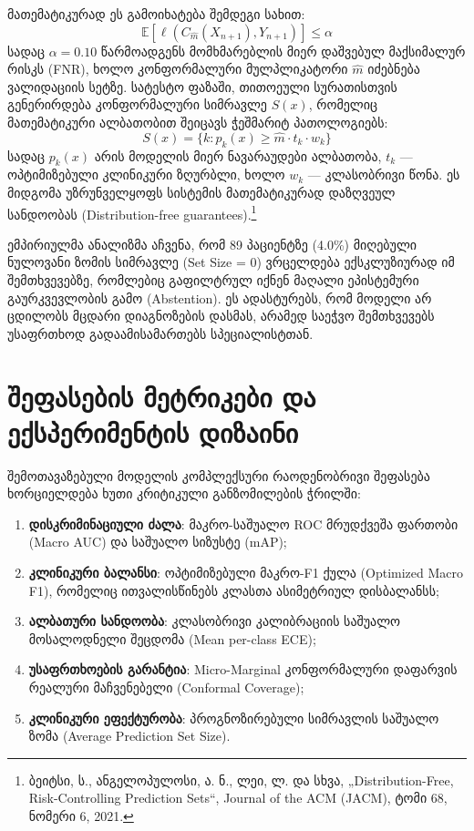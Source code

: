 \documentclass[12pt,a4paper,oneside]{report}
\begin{document}
მათემატიკურად ეს გამოიხატება შემდეგი სახით:
\begin{equation}
\mathbb{E}[\ell(C_{\hat{m}}(X_{n+1}), Y_{n+1})] \leq \alpha
\end{equation}
სადაც $\alpha = 0.10$ წარმოადგენს მომხმარებლის მიერ დაშვებულ მაქსიმალურ რისკს (FNR), ხოლო კონფორმალური მულპლიკატორი $\hat{m}$ იძებნება ვალიდაციის სეტზე. სატესტო ფაზაში, თითოეული სურათისთვის გენერირდება კონფორმალური სიმრავლე $S(x)$, რომელიც მათემატიკური ალბათობით შეიცავს ჭეშმარიტ პათოლოგიებს:
\begin{equation}
S(x) = \{ k : p_k(x) \geq \hat{m} \cdot t_k \cdot w_k \}
\end{equation}
სადაც $p_k(x)$ არის მოდელის მიერ ნავარაუდები ალბათობა, $t_k$ — ოპტიმიზებული კლინიკური ზღურბლი, ხოლო $w_k$ — კლასობრივი წონა. ეს მიდგომა უზრუნველყოფს სისტემის მათემატიკურად დაზღვეულ სანდოობას (Distribution-free guarantees).\footnote{ბეიტსი, ს., ანგელოპულოსი, ა. ნ., ლეი, ლ. და სხვა, „Distribution-Free, Risk-Controlling Prediction Sets“, Journal of the ACM (JACM), ტომი 68, ნომერი 6, 2021.} 

ემპირიულმა ანალიზმა აჩვენა, რომ 89 პაციენტზე (4.0\%) მიღებული ნულოვანი ზომის სიმრავლე (Set Size = 0) ვრცელდება ექსკლუზიურად იმ შემთხვევებზე, რომლებიც გაფილტრულ იქნენ მაღალი ეპისტემური გაურკვევლობის გამო (Abstention). ეს ადასტურებს, რომ მოდელი არ ცდილობს მცდარი დიაგნოზების დასმას, არამედ საეჭვო შემთხვევებს უსაფრთხოდ გადაამისამართებს სპეციალისტთან.

\section{შეფასების მეტრიკები და ექსპერიმენტის დიზაინი}
შემოთავაზებული მოდელის კომპლექსური რაოდენობრივი შეფასება ხორციელდება ხუთი კრიტიკული განზომილების ჭრილში: 
\begin{enumerate}
    \item \textbf{დისკრიმინაციული ძალა}: მაკრო-საშუალო ROC მრუდქვეშა ფართობი (Macro AUC) და საშუალო სიზუსტე (mAP);
    \item \textbf{კლინიკური ბალანსი}: ოპტიმიზებული მაკრო-F1 ქულა (Optimized Macro F1), რომელიც ითვალისწინებს კლასთა ასიმეტრიულ დისბალანსს;
    \item \textbf{ალბათური სანდოობა}: კლასობრივი კალიბრაციის საშუალო მოსალოდნელი შეცდომა (Mean per-class ECE);
    \item \textbf{უსაფრთხოების გარანტია}: Micro-Marginal კონფორმალური დაფარვის რეალური მაჩვენებელი (Conformal Coverage);
    \item \textbf{კლინიკური ეფექტურობა}: პროგნოზირებული სიმრავლის საშუალო ზომა (Average Prediction Set Size).
\end{enumerate}
\end{document}
